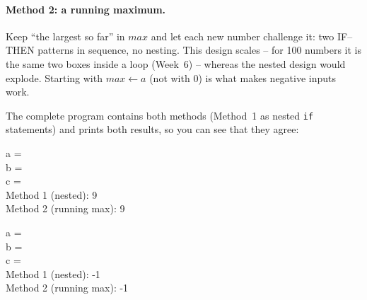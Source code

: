 \documentclass[11pt,a4paper]{article}
\begin{document}
\paragraph{Method 2: a running maximum.} Keep ``the largest so far'' in $max$ and let each new number challenge it: two IF--THEN patterns in sequence, no nesting. This design scales -- for 100 numbers it is the same two boxes inside a loop (Week~6) -- whereas the nested design would explode. Starting with $max \gets a$ (not with $0$) is what makes negative inputs work.
\begin{center}
\begin{minipage}[c]{0.4\linewidth}\centering
{}
\end{minipage}\hfill
\begin{minipage}[c]{0.56\linewidth}
The complete program contains both methods (Method~1 as nested \texttt{if} statements) and prints both results, so you can see that they agree:
\begin{consolebox}
a = \\ b = \\ c = \\ Method 1 (nested): 9\\ Method 2 (running max): 9
\end{consolebox}
\begin{consolebox}
a = \\ b = \\ c = \\ Method 1 (nested): -1\\ Method 2 (running max): -1
\end{consolebox}
\end{minipage}
\end{center}

\end{document}
